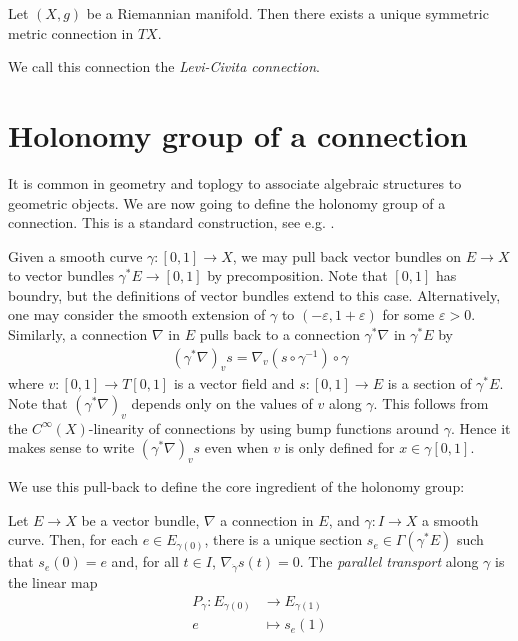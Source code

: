\documentclass{article}
\begin{document}
\begin{theorem}
  Let $(X,g)$ be a Riemannian manifold. Then there exists a unique
  symmetric metric connection in $TX$.
\end{theorem}

We call this connection the \emph{Levi-Civita connection}.

\section{Holonomy group of a connection}

It is common in geometry and toplogy to associate algebraic structures
to geometric objects. We are now going to define the holonomy group
of a connection. This is a standard construction, see e.g. \cite{joyce2007}.

Given a smooth curve $\gamma:[0,1]\to X$, we may pull back vector bundles
on $E\to X$ to vector bundles $\gamma^*E\to [0,1]$ by precomposition.
Note that $[0,1]$ has boundry, but the definitions of vector bundles
extend to this case. Alternatively, one may consider the smooth extension
of $\gamma$ to $(-\varepsilon,1+\varepsilon)$ for some $\varepsilon>0$.
Similarly, a connection $\nabla$ in $E$ pulls back to a connection
$\gamma^*\nabla$ in $\gamma^* E$ by
\begin{align*}
  (\gamma^*\nabla)_v s = \nabla_v (s\circ {\gamma}^{-1})\circ\gamma
\end{align*}
where $v:[0,1]\to T[0,1]$ is a vector field and $s:[0,1]\to E$
is a section of $\gamma^* E$. Note that $(\gamma^*\nabla)_v$ depends
only on the values of $v$ along $\gamma$. This follows from the
$C^\infty(X)$-linearity of connections by using bump functions around
$\gamma$. Hence it makes sense to write $(\gamma^*\nabla)_v s$
even when $v$ is only defined for $x\in\gamma[0,1]$.

We use this pull-back to define the core ingredient of the holonomy group:

\begin{definition}
  Let $E\to X$ be a vector bundle, $\nabla$ a connection in $E$,
  and $\gamma:I\to X$ a smooth curve. Then,
  for each $e\in E_{\gamma(0)}$, there is a unique section $s_e\in\Gamma(\gamma^* E)$
  such that $s_e(0)=e$ and, for all $t\in I$, $\nabla_{\dot\gamma} s(t) = 0$.
  The \emph{parallel transport} along $\gamma$ is the linear map
  \begin{align*}
    P_\gamma : E_{\gamma(0)} &\to E_{\gamma(1)} \\
    e &\mapsto s_e(1)
  \end{align*}
\end{definition}
\end{document}
